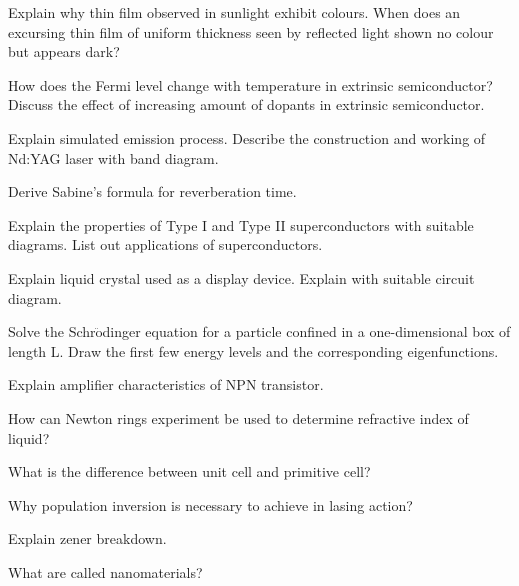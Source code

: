 \newpage \again

\partC
\item
\iitem Explain why thin film observed in sunlight exhibit colours. When does an excursing thin film
  of uniform thickness seen by reflected light shown no colour but appears dark?
\Or
\item How does the Fermi level change with temperature in extrinsic semiconductor? Discuss the 
  effect of increasing amount of dopants in extrinsic semiconductor.
\ene

\item
\iitem Explain simulated emission process. Describe the construction and working of Nd:YAG laser with 
  band diagram.
\Or
\item Derive Sabine's formula for reverberation time.
\ene

\item 
\iitem Explain the properties of Type I and Type II superconductors with suitable
  diagrams. List out applications of superconductors.
\Or
\item Explain liquid crystal used as a display device. Explain with suitable circuit diagram.
\ene

\item 
\iitem Solve the Schr$\ddot{\text{o}}$dinger equation for a particle confined in a
  one-dimensional box of length L. Draw the first few energy levels and the corresponding
  eigenfunctions.
\Or
\item Explain amplifier characteristics of NPN transistor.
\ene

\markC
\ene

\newpage


\sub{\subj}
\maxtime

\partA

\iitem How can Newton rings experiment be used to determine refractive index of liquid?
\item What is the difference between unit cell and primitive cell?
\item Why population inversion is necessary to achieve in lasing action?
\item Explain zener breakdown.
\item  What are called nanomaterials?

\markA
\partB

